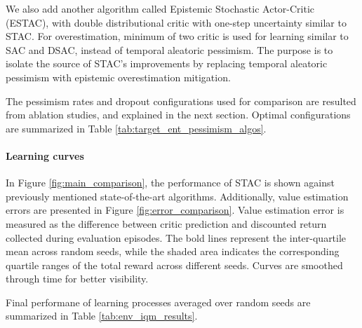 \documentclass[10pt]{article} %
\begin{document}
We also add another algorithm called Epistemic Stochastic Actor-Critic (ESTAC), with double distributional critic with one-step uncertainty similar to STAC. For overestimation, minimum of two critic is used for learning similar to SAC and DSAC, instead of temporal aleatoric pessimism. The purpose is to isolate the source of STAC's improvements by replacing temporal aleatoric pessimism with epistemic overestimation mitigation.

The pessimism rates and dropout configurations used for comparison are resulted from ablation studies, and explained in the next section. Optimal configurations are summarized in Table \ref{tab:target_ent_pessimism_algos}. 

\paragraph{Learning curves} In Figure \ref{fig:main_comparison}, the performance of STAC is shown against previously mentioned state-of-the-art algorithms. Additionally, value estimation errors are presented in Figure \ref{fig:error_comparison}. Value estimation error is measured as the difference between critic prediction and discounted return collected during evaluation episodes. The bold lines represent the inter-quartile mean across random seeds, while the shaded area indicates the corresponding quartile ranges of the total reward across different seeds. Curves are smoothed through time for better visibility. 

Final performane of learning processes averaged over random seeds are summarized in Table \ref{tab:env_iqm_results}. 

\end{document}
